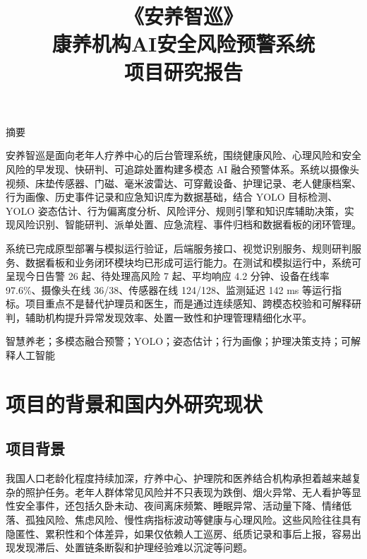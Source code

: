 \documentclass[UTF8,a4paper,zihao=-4,fontset=fandol]{ctexart}
\title{\xbs\zihao{3}《安养智巡》\\[0.45em]
{\heiti\zihao{4} 康养机构AI安全风险预警系统}\\[0.25em]
{\songti\zihao{-4} 项目研究报告}}
\author{}
\date{}
\begin{document}
\songti{}

\maketitle

{}
\begin{center}
{\heiti{} 摘要}
\end{center}

安养智巡是面向老年人疗养中心的后台管理系统，围绕健康风险、心理风险和安全风险的早发现、快研判、可追踪处置构建多模态 AI 融合预警体系。系统以摄像头视频、床垫传感器、门磁、毫米波雷达、可穿戴设备、护理记录、老人健康档案、行为画像、历史事件记录和应急知识库为数据基础，结合 YOLO 目标检测、YOLO 姿态估计、行为偏离度分析、风险评分、规则引擎和知识库辅助决策，实现风险识别、智能研判、派单处置、应急流程、事件归档和数据看板的闭环管理。

系统已完成原型部署与模拟运行验证，后端服务接口、视觉识别服务、规则研判服务、数据看板和业务闭环模块均已形成可运行能力。在测试和模拟运行中，系统可呈现今日告警 26 起、待处理高风险 7 起、平均响应 4.2 分钟、设备在线率 97.6\%、摄像头在线 36/38、传感器在线 124/128、监测延迟 142 ms 等运行指标。项目重点不是替代护理员和医生，而是通过连续感知、跨模态校验和可解释研判，辅助机构提升异常发现效率、处置一致性和护理管理精细化水平。

智慧养老；多模态融合预警；YOLO；姿态估计；行为画像；护理决策支持；可解释人工智能

\newpage
\begingroup
{}
\tableofcontents
\endgroup
\newpage

\section{项目的背景和国内外研究现状}

\subsection{项目背景}

我国人口老龄化程度持续加深，疗养中心、护理院和医养结合机构承担着越来越复杂的照护任务。老年人群体常见风险并不只表现为跌倒、烟火异常、无人看护等显性安全事件，还包括久卧未动、夜间离床频繁、睡眠异常、活动量下降、情绪低落、孤独风险、焦虑风险、慢性病指标波动等健康与心理风险。这些风险往往具有隐匿性、累积性和个体差异，如果仅依赖人工巡房、纸质记录和事后上报，容易出现发现滞后、处置链条断裂和护理经验难以沉淀等问题。
\end{document}
